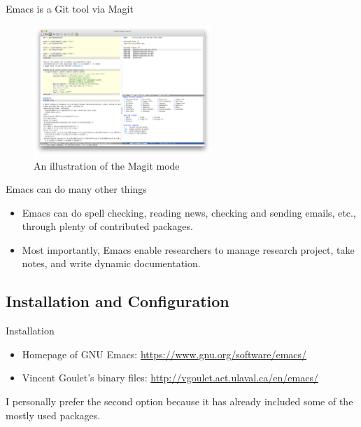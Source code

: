 \documentclass[presentation]{beamer}
\begin{document}
\begin{frame}[label={sec:orgea0dcdb}]{Emacs is a Git tool via Magit}
\begin{figure}[htbp]
\centering
\includegraphics[width=0.6\textwidth]{figure/magit_example.png}
\caption{An illustration of the Magit mode}
\end{figure}
\end{frame}

\begin{frame}[label={sec:orgb15c49a}]{Emacs can do many other things}
\begin{itemize}
\item Emacs can do spell checking, reading news, checking and sending
emails, etc., through plenty of contributed packages.
\item Most importantly, Emacs enable researchers to manage research
project, take notes, and write dynamic documentation.
\end{itemize}
\end{frame}


\subsection{Installation and Configuration}
\label{sec:org2c6a6a0}

\begin{frame}[label={sec:orgac32396}]{Installation}
\begin{itemize}
\item Homepage of GNU Emacs: \url{https://www.gnu.org/software/emacs/}

\item Vincent Goulet's binary files:
\url{http://vgoulet.act.ulaval.ca/en/emacs/}
\end{itemize}

\begin{NOTES}
I personally prefer the second option because it has already included
some of the mostly used packages.
\end{NOTES}
\end{frame}
\end{document}
